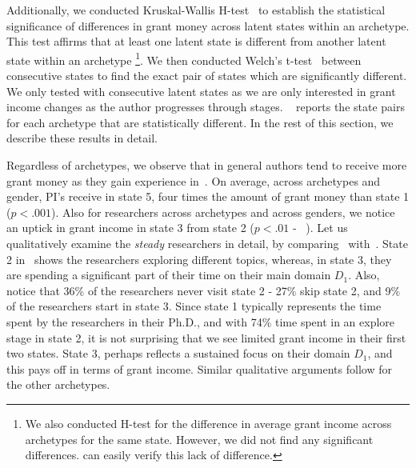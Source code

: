 Additionally, we conducted Kruskal-Wallis H-test~\cite{Kruskal:1952} to establish the statistical significance of differences in grant money across latent states within an archetype. This test affirms that at least one latent state is different from another latent state within an archetype \footnote{ We also conducted H-test for the difference in average grant income across archetypes for the same state. However, we did not find any significant differences.  can easily verify this lack of difference. }. We then conducted Welch's t-test~\cite{Welch:1947} between consecutive states to find the exact pair of states which are significantly different. We only tested with consecutive latent states as we are only interested in grant income changes as the author progresses through stages. ~ reports the state pairs for each archetype that are statistically different. In the rest of this section, we describe these results in detail.

Regardless of archetypes, we observe that in general authors tend to receive more grant money as they gain experience in~. On average, across archetypes and gender, PI's receive in state 5, four times the amount of grant money than state 1 ($p < .001$). Also for researchers across archetypes and across genders, we notice an uptick in grant income in state 3 from state 2 ($p < .01$ - ~). Let us qualitatively examine the \emph{steady} researchers in detail, by comparing~ with~. State 2 in~ shows the researchers exploring different topics, whereas, in state 3, they are spending a significant part of their time on their main domain $D_1$. Also, notice that 36\% of the researchers never visit state 2 - 27\% skip state 2, and 9\% of the researchers start in state 3. Since state 1 typically represents the time spent by the researchers in their Ph.D., and with 74\% time spent in an explore stage in state 2, it is not surprising that we see limited grant income in their first two states. State 3, perhaps reflects a sustained focus on their domain $D_1$, and this pays off in terms of grant income. Similar qualitative arguments follow for the other archetypes.


